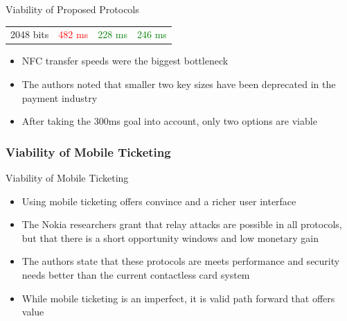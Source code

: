 \documentclass[unknownkeysallowed]{beamer}
\begin{document}
\begin{frame}
\begin{center}
\begin{minipage}{.9\textwidth}
\begin{block}{Viability of Proposed Protocols}
\begin{table}
{\begin{tabular}{c|c|c|c}
            2048 bits & \textcolor{red}{482 ms} & \textcolor{green}{228 ms} & \textcolor{green}{246 ms}\\
          \end{tabular}
        }
      \end{table}
      \begin{itemize}
        \item<2->{NFC transfer speeds were the biggest bottleneck}
        \item<3->{The authors noted that smaller two key sizes have been deprecated in the payment industry}
        \item<5->{After taking the 300ms goal into account, only two options are viable}
      \end{itemize}
    \end{block}
  \end{minipage}
  \end{center}
\end{frame}

\begin{frame}
\frametitle{Viability of Mobile Ticketing}
  \begin{center}
  \begin{minipage}{.9\textwidth}
    \begin{block}{Viability of Mobile Ticketing}
        \begin{itemize}
        \item{Using mobile ticketing offers convince and a richer user interface}
        \pause
        \vspace{1mm}
        \item{The Nokia researchers grant that relay attacks are possible in all protocols, but that there is a short opportunity windows and low monetary gain }
        \pause
        \vspace{1mm}
        \item{The authors state that these protocols are meets performance and security needs better than the current contactless card system}
        \pause
        \vspace{1mm}
        \item{While mobile ticketing is an imperfect, it is valid path forward that offers value}
      \end{itemize}
    \end{block}
  \end{minipage}
  \end{center}
\end{frame}
\end{document}
